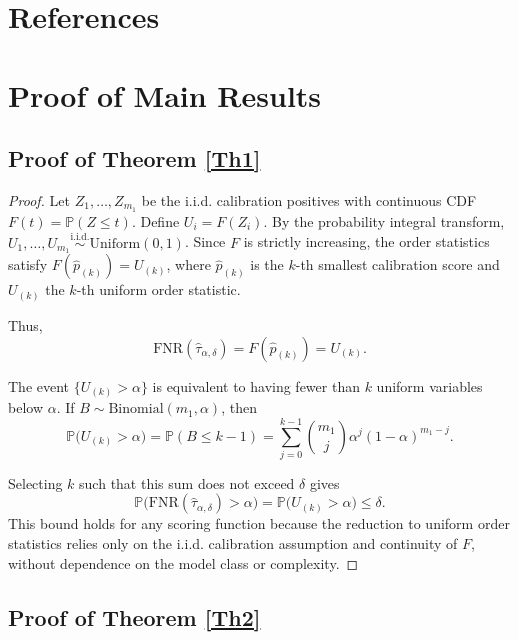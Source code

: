 \documentclass[journal,twoside,web]{ieeecolor}
\begin{document}
\section*{References}





\appendices

\section{Proof of Main Results}\label{S6}

\subsection{Proof of Theorem \ref{Th1}}\label{S6-1}

\begin{proof}
Let $Z_1, \dots, Z_{m_1}$ be the i.i.d. calibration positives with continuous CDF $F(t) = \mathbb{P}(Z \leq t)$. 
Define $U_i = F(Z_i)$. 
By the probability integral transform, $U_1, \dots, U_{m_1} \stackrel{\text{i.i.d.}}{\sim} \mathrm{Uniform}(0,1)$. 
Since $F$ is strictly increasing, the order statistics satisfy $F(\hat{p}_{(k)}) = U_{(k)}$, where $\hat{p}_{(k)}$ is the $k$-th smallest calibration score and $U_{(k)}$ the $k$-th uniform order statistic.  

Thus,
\[
\mathrm{FNR}(\hat{\tau}_{\alpha,\delta}) = F(\hat{p}_{(k)}) = U_{(k)}.
\]

The event $\{U_{(k)} > \alpha\}$ is equivalent to having fewer than $k$ uniform variables below $\alpha$. 
If $B \sim \mathrm{Binomial}(m_1, \alpha)$, then
\[
\mathbb{P}\bigl(U_{(k)} > \alpha\bigr) 
= \mathbb{P}(B \le k-1) 
= \sum_{j=0}^{k-1} \binom{m_1}{j} \alpha^j (1-\alpha)^{m_1-j}.
\]

Selecting $k$ such that this sum does not exceed $\delta$ gives
\[
\mathbb{P}\bigl(\mathrm{FNR}(\hat{\tau}_{\alpha,\delta}) > \alpha\bigr) = \mathbb{P}\bigl(U_{(k)} > \alpha\bigr) \le \delta.
\]
This bound holds for any scoring function because the reduction to uniform order statistics relies only on the i.i.d. calibration assumption and continuity of $F$, without dependence on the model class or complexity.
\end{proof}

\subsection{Proof of Theorem \ref{Th2}}\label{S6-2}
\end{document}
